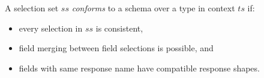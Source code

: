 \begin{definition}
A \gql selection set $ss$ \textit{conforms} to a schema \schema over a type in context $ts$ if:
\begin{itemize}
    \item every selection in $ss$ is consistent, 

    \item field merging between field selections is possible, and

    \item fields with same response name have compatible response shapes.
\end{itemize}
\end{definition}

